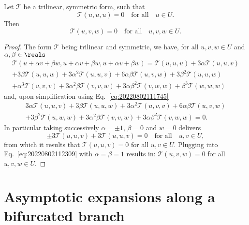 \begin{theorem}
  \label{thr:20220802112835}
  Let $\mathcal T$ be a trilinear, symmetric form, such that
  \begin{equation}
    \label{eq:20220802111745}
    \mathcal T(u, u, u) = 0 \quad \text{for all} \quad u \in U.
  \end{equation}
  Then
  \begin{equation}
    \mathcal T(u, v, w) = 0 \quad \text{for all} \quad u, v, w \in U.
  \end{equation}
\end{theorem}
\begin{proof}
  The form $\mathcal T$ being trilinear and symmetric, we have, for all $u, v, w \in U$ and $\alpha, \beta \in \reals$
  \begin{multline*}
    \mathcal T(u + \alpha v + \beta w, u + \alpha v + \beta w, u + \alpha v + \beta w) = \mathcal T(u, u, u) + 3\alpha \mathcal T(u, u, v)\\
    + 3\beta \mathcal T(u, u, w) + 3\alpha^2 \mathcal T(u, u, v) + 6 \alpha \beta \mathcal T(u, v, w) + 3 \beta^2 \mathcal T(u, u, w)\\
    + \alpha^3 \mathcal T(v, v, v) + 3 \alpha^2 \beta \mathcal T(v, v, w) + 3 \alpha \beta^2 \mathcal T(v, w, w) + \beta^3 \mathcal T(w, w, w)
  \end{multline*}
  and, upon simplification using Eq.~\eqref{eq:20220802111745}
  \begin{multline}
    \label{eq:20220802112309}
    3\alpha \mathcal T(u, u, v) + 3\beta \mathcal T(u, u, w) + 3\alpha^2 \mathcal T(u, v, v) + 6 \alpha \beta \mathcal T(u, v, w)\\
    + 3 \beta^2 \mathcal T(u, w, w) + 3 \alpha^2 \beta \mathcal T(v, v, w) + 3 \alpha \beta^2 \mathcal T(v, w, w) = 0.
  \end{multline}
  In particular taking successively $\alpha = ±1$, $\beta = 0$ and $w = 0$ delivers
  \begin{equation*}
    ±3 \mathcal T(u, u, v) + 3 \mathcal T(u, u, v) = 0 \quad \text{for all} \quad u, v \in U,
  \end{equation*}
  from which it results that $\mathcal T(u, u, v) = 0$ for all $u, v \in U$. Plugging into Eq.~\eqref{eq:20220802112309}
  with $\alpha = \beta = 1$ results in: $\mathcal T(u, v, w) = 0$ for all $u, v, w \in U$.
\end{proof}

\section{Asymptotic expansions along a bifurcated branch}
\label{sec:20220905060440}


